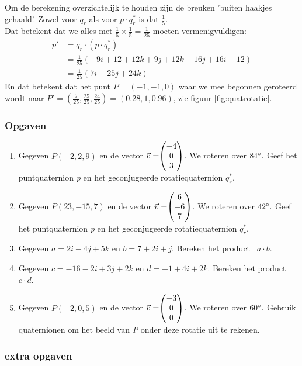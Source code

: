 Om de berekening overzichtelijk te houden zijn de breuken 'buiten haakjes gehaald'. Zowel voor $ q_r $ als voor $ p\cdot q^*_r $ is dat $  \frac{1}{5}. $ 
\\Dat betekent dat we alles met $  \frac{1}{5} \times  \frac{1}{5}  =  \frac{1}{25} $ moeten vermenigvuldigen: 
\begin{align*}
p' &=  q_r\cdot (p\cdot q^*_r)  \\
&=  \frac{1}{25}(-9i + 12 +12k + 9j + 12k + 16j + 16i -  12)  \\
& = \frac{1}{25} (7i + 25j +  24k  )
\end{align*}
En dat betekent dat het punt $ P=(-1,-1,0)  $ waar we mee begonnen  geroteerd wordt naar $ P'=  (\frac{7}{25}, \frac{25}{25}, \frac{24}{25}) =(0.28,1,0.96)  $, zie  figuur \ref{fig:quatrotatie}.

\subsubsection{Opgaven}
\begin{enumerate}
	\item Gegeven $ P (-2, 2, 9) $ en de vector $\vec{v} = \vecdrie{-4}{0}{3} $. 
	We roteren over $ 84\degree. $ Geef het puntquaternion \textit{p} en het geconjugeerde rotatiequaternion  $  q_r^* $.
	\item Gegeven $ P (23, -15, 7) $ en de vector $\vec{v} = \vecdrie{6}{-6}{7} $. 
	We roteren over $ 42\degree. $ Geef het puntquaternion \textit{p} en het geconjugeerde rotatiequaternion  $  q_r^* $.
	
	\item Gegeven $ a = 2i-4j+5k$ en   $ b = 7+2i+j $. 
	Bereken het product \ $  a\cdot b $.
	\item Gegeven $ c = -16 -2i+3j+2k $ en   $ d = -1+4i+2k $. 
	Bereken het product \ $  c\cdot d $.
	
	\item Gegeven $ P (-2, 0, 5) $ en de vector $\vec{v} = \vecdrie{-3}{0}{0} $. 
	We roteren over $ 60\degree. $ Gebruik quaternionen om het beeld van \textit{P }onder deze rotatie uit te rekenen.
	
\end{enumerate}

\subsubsection{extra opgaven}

